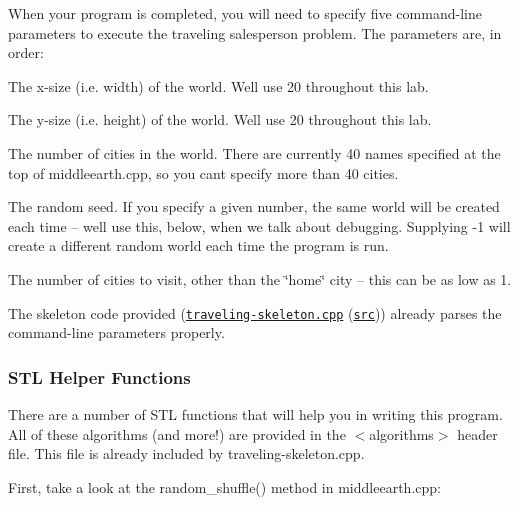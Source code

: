 When your program is completed, you will need to specify five command-\/line parameters to execute the traveling salesperson problem. The parameters are, in order\+:


\begin{DoxyEnumerate}
\item The x-\/size (i.\+e. width) of the world. We\textquotesingle{}ll use 20 throughout this lab.
\end{DoxyEnumerate}
\begin{DoxyEnumerate}
\item The y-\/size (i.\+e. height) of the world. We\textquotesingle{}ll use 20 throughout this lab.
\end{DoxyEnumerate}
\begin{DoxyEnumerate}
\item The number of cities in the world. There are currently 40 names specified at the top of middleearth.\+cpp, so you can\textquotesingle{}t specify more than 40 cities.
\end{DoxyEnumerate}
\begin{DoxyEnumerate}
\item The random seed. If you specify a given number, the same world will be created each time -- we\textquotesingle{}ll use this, below, when we talk about debugging. Supplying -\/1 will create a different random world each time the program is run.
\end{DoxyEnumerate}
\begin{DoxyEnumerate}
\item The number of cities to visit, other than the \char`\"{}home\char`\"{} city -- this can be as low as 1.
\end{DoxyEnumerate}

The skeleton code provided (\href{traveling-skeleton.cpp.html}{\tt traveling-\/skeleton.\+cpp} (\href{traveling-skeleton.cpp}{\tt src})) already parses the command-\/line parameters properly.

\subsubsection*{S\+TL Helper Functions}

There are a number of S\+TL functions that will help you in writing this program. All of these algorithms (and more!) are provided in the {\ttfamily $<$algorithms$>$} header file. This file is already included by traveling-\/skeleton.\+cpp.

First, take a look at the {\ttfamily random\+\_\+shuffle()} method in middleearth.\+cpp\+:


